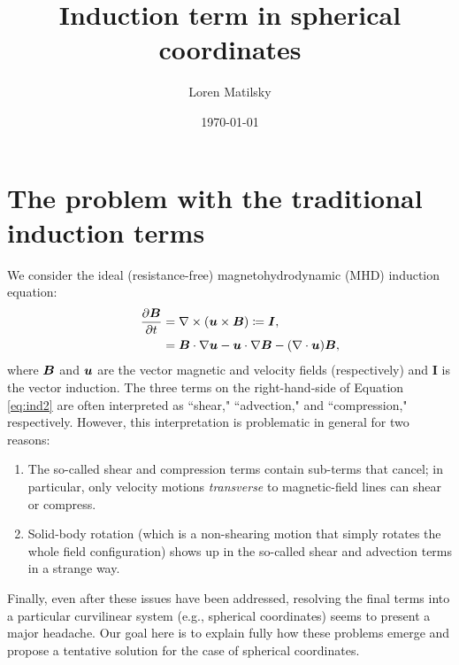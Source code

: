 \documentclass[12pt]{article}
\date{\today}
\author{Loren Matilsky}
\title{Induction term in spherical coordinates}
\newcommand{\veci}{\bm{I}}
\begin{document}
\maketitle

\section{The problem with the traditional induction terms}
We consider the ideal (resistance-free) magnetohydrodynamic (MHD) induction equation:
\begin{align}
	\five\pderiv{\vecb}{t} &= \curl(\vecu\times\vecb) \label{eq:ind1}\define\veci,\\
	&= \vecb\dotgrad\vecu - \vecu\dotgrad\vecb -(\Div\vecu)\vecb, \label{eq:ind2}
\end{align}
where $\bm{B}$ and $\bm{u}$ are the vector magnetic and velocity fields (respectively) and $\veci$ is the vector induction. The three terms on the right-hand-side of Equation \eqref{eq:ind2} are often interpreted as ``shear," ``advection," and ``compression," respectively. However, this interpretation is problematic in general for two reasons:

\begin{enumerate}
	\item The so-called shear and compression terms contain sub-terms that cancel; in particular, only velocity motions \textit{transverse} to magnetic-field lines can shear or compress. \label{enum:problem1}
	\item Solid-body rotation (which is a non-shearing motion that simply rotates the whole field configuration) shows up in the so-called shear and advection terms in a strange way. \label{enum:problem2}
\end{enumerate}

Finally, even after these issues have been addressed, resolving the final terms into a particular curvilinear system (e.g., spherical coordinates) seems to present a major headache. Our goal here is to explain fully how these problems emerge and propose a tentative solution for the case of spherical coordinates. 
\end{document}
